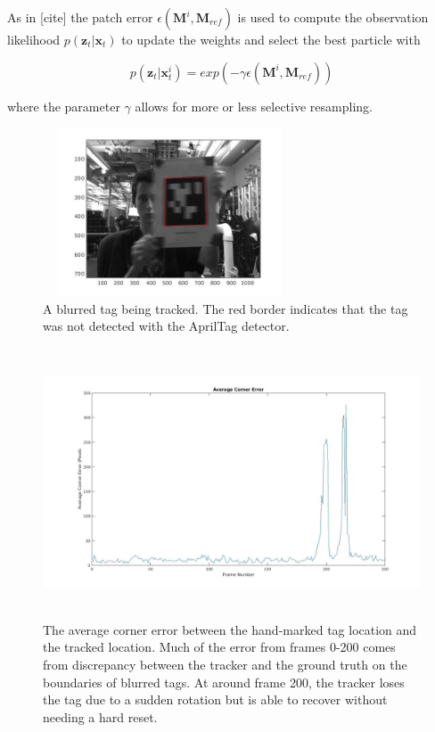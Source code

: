 \documentclass[letterpaper, 10 pt, conference]{ieeeconf}
\renewcommand{\vec}[1]{\boldsymbol{#1}}
\begin{document}
As in [cite] the patch error $\epsilon(\vec{M}^{i}, \vec{M}_{ref})$ is used to compute the observation likelihood $p(\vec{z}_t|\vec{x}_t)$ to update the weights and select the best particle with


\begin{equation}
	p(\vec{z}_t|\vec{x}^i_t) = exp(-\gamma \epsilon(\vec{M}^i, \vec{M}_{ref}))
\end{equation}

where the parameter $\gamma$ allows for more or less selective resampling.



\begin{figure}[b]
	\centering
	\includegraphics[width=7.5cm,height=5cm]{tracked_tag}
	\caption{A blurred tag being tracked. The red border indicates that the tag was not detected with the AprilTag detector.}
\end{figure}

\begin{figure}[t]
	\label{fig:error}
	\includegraphics[width=\textwidth,height=8cm]{Average_Error}
	\caption{The average corner error between the hand-marked tag location and the tracked location. Much of the error from frames 0-200 comes from discrepancy between the tracker and the ground truth on the boundaries of blurred tags. At around frame 200, the tracker loses the tag due to a sudden rotation but is able to recover without needing a hard reset.}
\end{figure}
\end{document}

